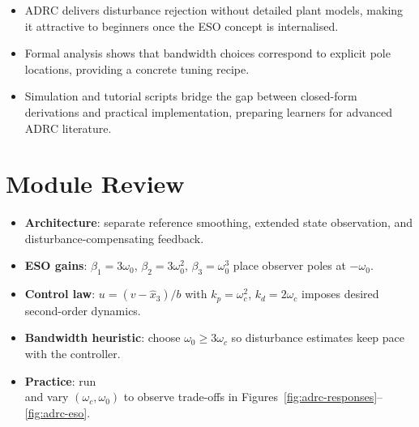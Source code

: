 \begin{takeaway}
\begin{itemize}[leftmargin=*]
    \item ADRC delivers disturbance rejection without detailed plant models, making it attractive to beginners once the ESO concept is internalised.
    \item Formal analysis shows that bandwidth choices correspond to explicit pole locations, providing a concrete tuning recipe.
    \item Simulation and tutorial scripts bridge the gap between closed-form derivations and practical implementation, preparing learners for advanced ADRC literature.
\end{itemize}
\end{takeaway}

\section{Module Review}
\begin{itemize}[leftmargin=*]
    \item \textbf{Architecture}: separate reference smoothing, extended state observation, and disturbance-compensating feedback.
    \item \textbf{ESO gains}: $\beta_1 = 3\omega_0$, $\beta_2 = 3\omega_0^2$, $\beta_3 = \omega_0^3$ place observer poles at $-\omega_0$.
    \item \textbf{Control law}: $u = (v - \hat{x}_3)/b$ with $k_p = \omega_c^2$, $k_d = 2\omega_c$ imposes desired second-order dynamics.
    \item \textbf{Bandwidth heuristic}: choose $\omega_0 \ge 3 \omega_c$ so disturbance estimates keep pace with the controller.
    \item \textbf{Practice}: run \\and vary $(\omega_c, \omega_0)$ to observe trade-offs in Figures~\ref{fig:adrc-responses}--\ref{fig:adrc-eso}.
\end{itemize}

